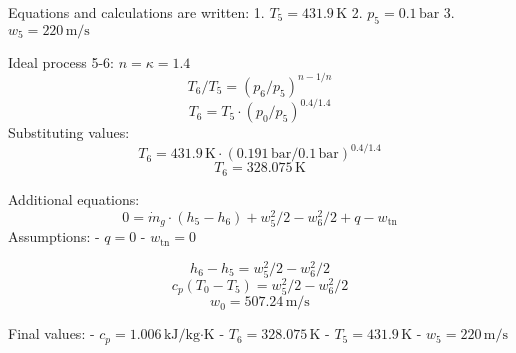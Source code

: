 Equations and calculations are written:  
1. \( T_5 = 431.9 \, \text{K} \)  
2. \( p_5 = 0.1 \, \text{bar} \)  
3. \( w_5 = 220 \, \text{m/s} \)  

Ideal process 5-6: \( n = \kappa = 1.4 \)  
\[ T_6 / T_5 = (p_6 / p_5)^{n-1/n} \]  
\[ T_6 = T_5 \cdot (p_0 / p_5)^{0.4/1.4} \]  
Substituting values:  
\[ T_6 = 431.9 \, \text{K} \cdot (0.191 \, \text{bar} / 0.1 \, \text{bar})^{0.4/1.4} \]  
\[ T_6 = 328.075 \, \text{K} \]  

Additional equations:  
\[ 0 = \dot{m}_g \cdot (h_5 - h_6) + w_5^2 / 2 - w_6^2 / 2 + q - w_{\text{tn}} \]  
Assumptions:  
- \( q = 0 \)  
- \( w_{\text{tn}} = 0 \)  

\[ h_6 - h_5 = w_5^2 / 2 - w_6^2 / 2 \]  
\[ c_p(T_0 - T_5) = w_5^2 / 2 - w_6^2 / 2 \]  
\[ w_0 = 507.24 \, \text{m/s} \]  

Final values:  
- \( c_p = 1.006 \, \text{kJ/kg·K} \)  
- \( T_6 = 328.075 \, \text{K} \)  
- \( T_5 = 431.9 \, \text{K} \)  
- \( w_5 = 220 \, \text{m/s} \)